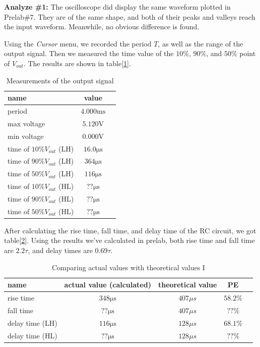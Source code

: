 \textbf{Analyze \#1:} \newline
\phantom{ } The oscilloscope did display the same waveform plotted in Prelab\#7. They are of the same shape, and both of their peaks and valleys reach the input waveform. Meanwhile, no obvious difference is found. \newline

Using the \textit{Cursor} menu, we recorded the period $T$, as well as the range of the output signal. Then we measured the time value of the $10\%$, $90\%$, and $50\%$ point of $V_{out}$. The results are shown in table[\ref{tab:mea}].

\begin{table}[!htbp]
	\centering
	\caption{Measurements of the output signal}
	\begin{tabular}{lcl}
		\toprule
		name & value & \\
		\midrule
		period & $4.000\mathrm{ms}$ & \\
		max voltage & $5.120\mathrm{V}$ & \\
		min voltage & $0.000\mathrm{V}$ & \\
		time of $10\% V_{out}$ (LH) & $16.0\mathrm{\mu s}$ & \\
		time of $90\% V_{out}$ (LH) & $364\mathrm{\mu s}$ & \\
		time of $50\% V_{out}$ (LH) & $116\mathrm{\mu s}$ & \\
		time of $10\% V_{out}$ (HL) & $??\mathrm{\mu s}$ & \\
		time of $90\% V_{out}$ (HL) & $??\mathrm{\mu s}$ & \\
		time of $50\% V_{out}$ (HL) & $??\mathrm{\mu s}$ & \\
		\bottomrule
	\end{tabular}
	\label{tab:mea}
\end{table}

\phantom{ } After calculating the rise time, fall time, and delay time of the RC circuit, we got table[\ref{tab:cal}]. Using the results we've calculated in prelab, both rise time and fall time are $2.2\tau$, and delay times are $0.69\tau$.

\begin{table}[!htbp]
	\centering
	\caption{Comparing actual values with theoretical values I}
	\begin{tabular}{lcccl}
		\toprule
		name & actual value (calculated) & theoretical value & PE & \\
		\midrule
		rise time & $348\mathrm{\mu s}$ & ${407\mu s}$ & $58.2\%$ & \\
		fall time & $??\mathrm{\mu s}$ &  ${407\mu s}$ & $??\%$ & \\
		delay time (LH) & $116\mathrm{\mu s}$ & ${128\mu s}$ & $68.1\%$ & \\
		delay time (HL) & $??\mathrm{\mu s}$ &  ${128\mu s}$ & $??\%$ & \\
		\bottomrule
	\end{tabular}
	\label{tab:cal}
\end{table}

